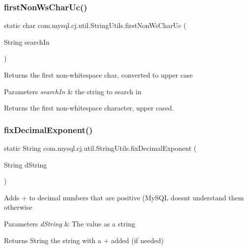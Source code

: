 \subsubsection{\texorpdfstring{first\+Non\+Ws\+Char\+Uc()}{firstNonWsCharUc()}}
{\footnotesize\ttfamily static char com.\+mysql.\+cj.\+util.\+String\+Utils.\+first\+Non\+Ws\+Char\+Uc (\begin{DoxyParamCaption}\item[{String}]{search\+In }\end{DoxyParamCaption})\hspace{0.3cm}{\ttfamily [static]}}

Returns the first non-\/whitespace char, converted to upper case


\begin{DoxyParams}{Parameters}
{\em search\+In} & the string to search in\\
\hline
\end{DoxyParams}
\begin{DoxyReturn}{Returns}
the first non-\/whitespace character, upper cased. 
\end{DoxyReturn}
\mbox{\label{classcom_1_1mysql_1_1cj_1_1util_1_1_string_utils_a08f760ff86a02721422aa21707cfb80b}} 
\subsubsection{\texorpdfstring{fix\+Decimal\+Exponent()}{fixDecimalExponent()}}
{\footnotesize\ttfamily static String com.\+mysql.\+cj.\+util.\+String\+Utils.\+fix\+Decimal\+Exponent (\begin{DoxyParamCaption}\item[{String}]{d\+String }\end{DoxyParamCaption})\hspace{0.3cm}{\ttfamily [static]}}

Adds \textquotesingle{}+\textquotesingle{} to decimal numbers that are positive (My\+S\+QL doesn\textquotesingle{}t understand them otherwise


\begin{DoxyParams}{Parameters}
{\em d\+String} & The value as a string\\
\hline
\end{DoxyParams}
\begin{DoxyReturn}{Returns}
String the string with a \textquotesingle{}+\textquotesingle{} added (if needed) 
\end{DoxyReturn}
\mbox{\label{classcom_1_1mysql_1_1cj_1_1util_1_1_string_utils_a460ad9e9bb0873d806d2078891d8d416}} 
